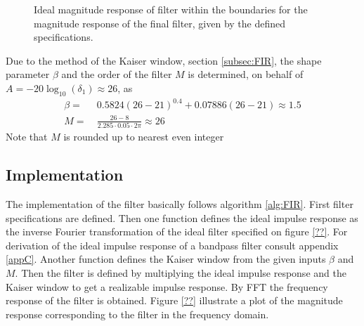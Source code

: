 \begin{figure}[H]
\centering
{}
\caption{Ideal magnitude response of filter within the boundaries for the magnitude response of the final filter, given by the defined specifications.}
\label{fig:spec_Hd}
\end{figure}

Due to the method of the Kaiser window, section \ref{subsec:FIR}, the shape parameter $\beta$ and the order of the filter $M$ is determined, on behalf of $A=-20\log_{10}(\delta_1) \approx 26 $, as  
\begin{align}
\beta =& \ 0.5824(26-21)^{0.4} + 0.07886(26-21)  \approx 1.5 \\
M =& \ \frac{26-8}{2.285 \cdot 0.05\cdot 2\pi}\approx 26 
\end{align}
Note that $M$ is rounded up to nearest even integer 
\subsection{Implementation}
The implementation of the filter basically follows algorithm \ref{alg:FIR}. First filter specifications are defined. Then one function defines the ideal impulse response as the inverse Fourier transformation of the ideal filter specified on figure \ref{??}. For derivation of the ideal impulse response of a bandpass filter consult appendix \ref{appC}. Another function defines the Kaiser window from the given inputs $\beta$ and $M$. Then the filter is defined by multiplying the ideal impulse response and the Kaiser window to get a realizable impulse response. By FFT the frequency response of the filter is obtained. Figure \ref{??} illustrate a plot of the magnitude response corresponding to the filter in the frequency domain.   

